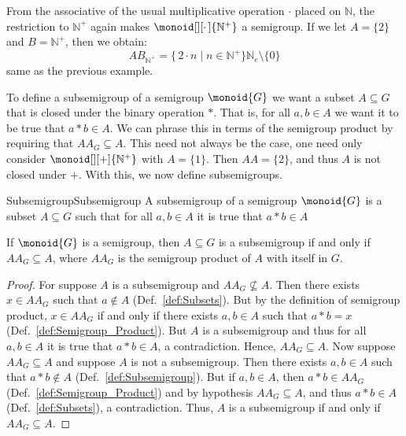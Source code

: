         \begin{example}
            From the associative of the usual multiplicative operation $\cdot$
            placed on $\mathbb{N}$, the restriction to $\mathbb{N}^{+}$ again
            makes $\monoid[][\cdot\,]{\mathbb{N}^{+}}$ a semigroup. If we let
            $A=\{2\}$ and $B=\mathbb{N}^{+}$, then we obtain:
            \begin{equation}
                AB_{\mathbb{N}^{+}}=\{\,2\cdot{n}\;|\;n\in\mathbb{N}^{+}\}
                    \mathbb{N}_{e}\setminus\{0\}
            \end{equation}
            same as the previous example.
        \end{example}
        To define a subsemigroup of a semigroup $\monoid{G}$ we want a subset
        $A\subseteq{G}$ that is closed under the binary operation $*$. That is,
        for all $a,b\in{A}$ we want it to be true that $a*b\in{A}$. We can
        phrase this in terms of the semigroup product by requiring that
        $AA_{G}\subseteq{A}$. This need not always be the case, one need only
        consider $\monoid[][+]{\mathbb{N}^{+}}$ with $A=\{1\}$. Then $AA=\{2\}$,
        and thus $A$ is not closed under $+$. With this, we now define
        subsemigroups.
        \begin{fdefinition}{Subsemigroup}{Subsemigroup}
            A subsemigroup of a semigroup $\monoid{G}$ is a subset
            $A\subseteq{G}$ such that for all $a,b\in{A}$ it is true that
            $a*b\in{A}$
        \end{fdefinition}
        \begin{theorem}
            \label{thm:Equiv_Def_Subsemigroup}%
            If $\monoid{G}$ is a semigroup, then $A\subseteq{G}$ is a
            subsemigroup if and only if $AA_{G}\subseteq{A}$, where $AA_{G}$ is
            the semigroup product of $A$ with itself in $G$.
        \end{theorem}
        \begin{proof}
            For suppose $A$ is a subsemigroup and $AA_{G}\nsubseteq{A}$. Then
            there exists $x\in{AA_{G}}$ such that $a\notin{A}$
            (Def.~\ref{def:Subsets}). But by the definition of semigroup
            product, $x\in{AA}_{G}$ if and only if there exists $a,b\in{A}$
            such that $a*b=x$ (Def.~\ref{def:Semigroup_Product}). But $A$ is a
            subsemigroup and thus for all $a,b\in{A}$ it is true that
            $a*b\in{A}$, a contradiction. Hence, $AA_{G}\subseteq{A}$. Now
            suppose $AA_{G}\subseteq{A}$ and suppose $A$ is not a subsemigroup.
            Then there exists $a,b\in{A}$ such that $a*b\notin{A}$
            (Def.~\ref{def:Subsemigroup}). But if $a,b\in{A}$, then
            $a*b\in{AA}_{G}$ (Def.~\ref{def:Semigroup_Product}) and by
            hypothesis $AA_{G}\subseteq{A}$, and thus $a*b\in{A}$
            (Def.~\ref{def:Subsets}), a contradiction. Thus, $A$ is a
            subsemigroup if and only if $AA_{G}\subseteq{A}$.
        \end{proof}

